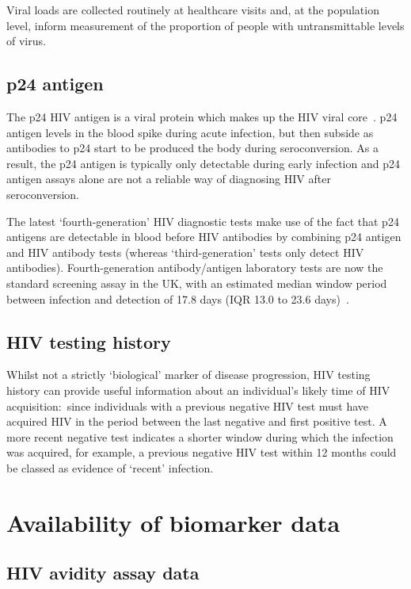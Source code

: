 Viral loads are collected routinely at healthcare visits and, at the population level, inform measurement of the proportion of people with untransmittable levels of virus.

\subsection{p24 antigen}

The p24 HIV antigen is a viral protein which makes up the HIV viral core~\parencite{Pebody2021-wr}\@. p24 antigen levels in the blood spike during acute infection, but then subside as antibodies to p24 start to be produced the body during seroconversion. As a result, the p24 antigen is typically only detectable during early infection and p24 antigen assays alone are not a reliable way of diagnosing HIV after seroconversion.

The latest `fourth-generation' HIV diagnostic tests make use of the fact that p24 antigens are detectable in blood before HIV antibodies by combining p24 antigen and HIV antibody tests (whereas `third-generation' tests only detect HIV antibodies). Fourth-generation antibody/antigen laboratory tests are now the standard screening assay in the UK, with an estimated median window period between infection and detection of 17.8 days (IQR 13.0 to 23.6 days)~\parencite{Delaney2017-co}.

\subsection{HIV testing history}

Whilst not a strictly `biological' marker of disease progression, HIV testing history can provide useful information about an individual's likely time of HIV acquisition:\ since individuals with a previous negative HIV test must have acquired HIV in the period between the last negative and first positive test. A more recent negative test indicates a shorter window during which the infection was acquired, for example, a previous negative HIV test within 12 months could be classed as evidence of `recent' infection.

\section{Availability of biomarker data}\label{appendix:biomarker-availability}

\subsection{HIV avidity assay data}

